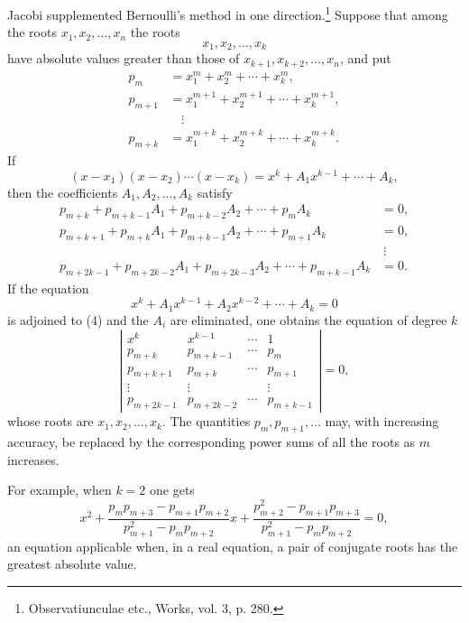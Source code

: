 \documentclass[11pt]{article}
\begin{document}
Jacobi supplemented Bernoulli's method in one direction.\footnote{Observatiunculae etc., Works, vol. 3, p. 280.} Suppose that among the roots $x_1,x_2,\ldots,x_n$ the roots
\[
        x_1,x_2,\ldots,x_k
\]
have absolute values greater than those of $x_{k+1},x_{k+2},\ldots,x_n$, and put
\begin{equation}
\begin{aligned}
        p_m     &=x_1^m+x_2^m+\cdots+x_k^m,\\
        p_{m+1} &=x_1^{m+1}+x_2^{m+1}+\cdots+x_k^{m+1},\\
        &\quad\vdots\\
        p_{m+k} &=x_1^{m+k}+x_2^{m+k}+\cdots+x_k^{m+k}.
\end{aligned}
\tag{2}
\end{equation}
If
\begin{equation}
        (x-x_1)(x-x_2)\cdots(x-x_k)
        =x^k+A_1x^{k-1}+\cdots+A_k,
\tag{3}
\end{equation}
then the coefficients $A_1,A_2,\ldots,A_k$ satisfy
\begin{equation}
\begin{aligned}
p_{m+k}+p_{m+k-1}A_1+p_{m+k-2}A_2+\cdots+p_mA_k&=0,\\
p_{m+k+1}+p_{m+k}A_1+p_{m+k-1}A_2+\cdots+p_{m+1}A_k&=0,\\
&\ \vdots\\
p_{m+2k-1}+p_{m+2k-2}A_1+p_{m+2k-3}A_2+\cdots+p_{m+k-1}A_k&=0.
\end{aligned}
\tag{4}
\end{equation}
If the equation
\[
        x^k+A_1x^{k-1}+A_2x^{k-2}+\cdots+A_k=0
\]
is adjoined to (4) and the $A_i$ are eliminated, one obtains the equation of degree $k$
\[
\left|
\begin{array}{cccc}
x^k&x^{k-1}&\cdots&1\\
p_{m+k}&p_{m+k-1}&\cdots&p_m\\
p_{m+k+1}&p_{m+k}&\cdots&p_{m+1}\\
\vdots&\vdots&&\vdots\\
p_{m+2k-1}&p_{m+2k-2}&\cdots&p_{m+k-1}
\end{array}\right|=0,
\]
whose roots are $x_1,x_2,\ldots,x_k$. The quantities $p_m,p_{m+1},\ldots$ may, with increasing accuracy, be replaced by the corresponding power sums of all the roots as $m$ increases.

For example, when $k=2$ one gets
\[
x^2+\frac{p_mp_{m+3}-p_{m+1}p_{m+2}}
          {p_{m+1}^2-p_mp_{m+2}}x
 +\frac{p_{m+2}^2-p_{m+1}p_{m+3}}
          {p_{m+1}^2-p_mp_{m+2}}=0,
\]
an equation applicable when, in a real equation, a pair of conjugate roots has the greatest absolute value.
\end{document}
